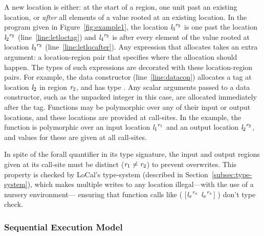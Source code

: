 \documentclass[acmsmall,acmthm=false,nonacm]{acmart}
\theoremstyle{straighttext0}
\theoremstyle{straighttext}
\newcommand{\Secref}[1]{Section~\ref{#1}}
\newcommand{\Figref}[1]{Figure~\ref{#1}}
\newcommand{\new}[1]{#1}
\begin{document}
A new location is either: at the start of a region, one unit past
an existing location, or {\em after} all elements of a value rooted at an
existing location.
%
In the program given in \Figref{fig:example1},
the location ${\mathit{l}_3}^{\mathit{r}_2}$ is one past the
location ${\mathit{l}_2}^{\mathit{r}_2}$ (line~\ref{line:letloctag})
and ${\mathit{l}_4}^{\mathit{r}_2}$ is after
every element of the value rooted at location ${\mathit{l}_3}^{\mathit{r}_2}$
(line~\ref{line:letlocafter}).
%
Any expression that allocates takes an extra argument:
a location-region pair that specifies where the allocation should happen.
%
The types of such expressions are decorated with these location-region pairs.
%
For example, the  data constructor
(line~\ref{line:datacon})
allocates a tag at location $\mathit{l}_2$ in region $\mathit{r}_2$, and has type .
%
Any scalar arguments passed to a data constructor, such as the
unpacked integer  in this case, are allocated immediately after
the tag.
%
Functions may be polymorphic over any of their input or output locations,
and these locations are provided at call-sites.
%
In the example, the function  is polymorphic over an
input location ${\mathit{l}_1}^{\mathit{r}_1}$ and an output location ${\mathit{l}_2}^{\mathit{r}_2}$,
and values for these are given at all call-sites.
%
\new{
In spite of the forall quantifier in its type signature,
the input and output regions given at its call-site must be distinct ($\mathit{r}_1 \neq \mathit{r}_2$) to prevent overwrites.
%
This property is checked by LoCal's type-system (described in \Secref{subsec:type-system}),
which makes multiple writes to any location illegal---with the use of a nursery environment---
ensuring that function calls like
(\il{constFold} [${\mathit{l}_x}^{\mathit{r}_x}$ ${\mathit{l}_x}^{\mathit{r}_x}$] \il{x})
don't type check.
}


\subsubsection{Sequential Execution Model}
\label{subsec:local-primer-eval}
\end{document}
